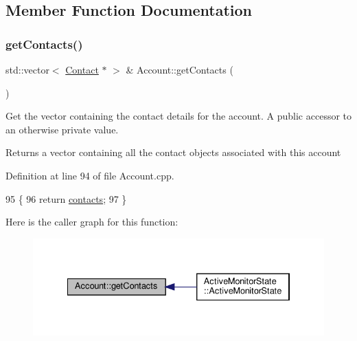 \subsection{Member Function Documentation}
\mbox{\label{class_account_a53a9e366a589538552a368e3bbac2fd3}} 
\subsubsection{\texorpdfstring{get\+Contacts()}{getContacts()}}
{\footnotesize\ttfamily std\+::vector$<$ \hyperlink{class_contact}{Contact} $\ast$ $>$ \& Account\+::get\+Contacts (\begin{DoxyParamCaption}{ }\end{DoxyParamCaption})}

Get the vector containing the contact details for the account. A public accessor to an otherwise private value.

\begin{DoxyReturn}{Returns}
a vector containing all the contact objects associated with this account 
\end{DoxyReturn}


Definition at line 94 of file Account.\+cpp.


\begin{DoxyCode}
95 \{
96     \textcolor{keywordflow}{return} \hyperlink{class_account_aa4f77abd7c44f2a70b0cff8088e3491f}{contacts};
97 \}
\end{DoxyCode}
Here is the caller graph for this function\+:\nopagebreak
\begin{figure}[H]
\begin{center}
\leavevmode
\includegraphics[width=334pt]{db/d22/class_account_a53a9e366a589538552a368e3bbac2fd3_icgraph}
\end{center}
\end{figure}
\mbox{\label{class_account_a5117acc0c4ef7be21c5339bd9ae84e40}} 
